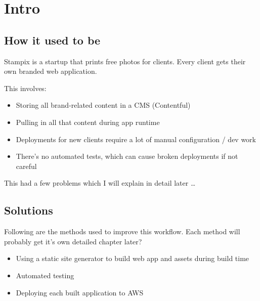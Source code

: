\chapter{Intro} %

\label{Chapter1} %


\newcommand{\keyword}[1]{\textbf{#1}}
\newcommand{\tabhead}[1]{\textbf{#1}}
\newcommand{\code}[1]{\texttt{#1}}
\newcommand{\file}[1]{\texttt{\bfseries#1}}
\newcommand{\option}[1]{\texttt{\itshape#1}}


\section{How it used to be}

Stampix is a startup that prints free photos for clients. Every client gets their own branded web application.

This involves:

\begin{itemize}
	\item Storing all brand-related content in a CMS (Contentful)
	\item Pulling in all that content during app runtime
	\item Deployments for new clients require a lot of manual configuration / dev work
	\item There's no automated tests, which can cause broken deployments if not careful
\end{itemize}

This had a few problems which I will explain in detail later \ldots


\section{Solutions}

Following are the methods used to improve this workflow. Each method will probably get it's own detailed chapter later?

\begin{itemize}
	\item Using a static site generator to build web app and assets during build time
	\item Automated testing
	\item Deploying each built application to AWS
\end{itemize}